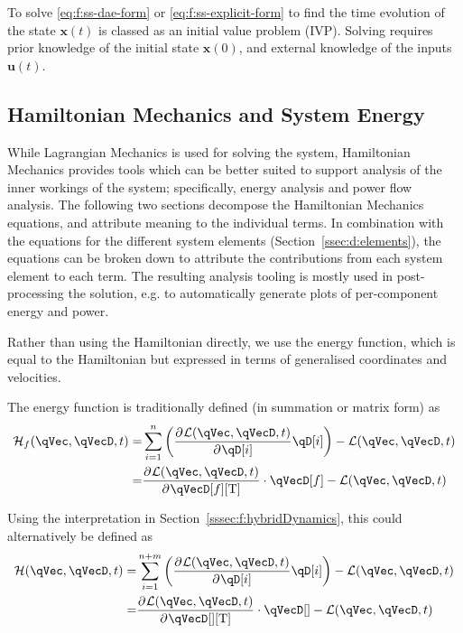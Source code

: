 \documentclass[11pt]{article}
\renewcommand{\secref}[1]{Section~\ref{#1}}
\newcommand{\pD}[2]{
    \frac{\partial\mspace{1mu}#1}{\partial\mspace{1mu}#2}
}
\begin{document}
To solve \eqref{eq:f:ss-dae-form} or \eqref{eq:f:ss-explicit-form} to find the time evolution of the state $\mathbf{x}(t)$ is classed as an initial value problem (IVP). Solving requires prior knowledge of the initial state $\mathbf{x}(0)$, and external knowledge of the inputs $\mathbf{u}(t)$.


\subsection{Hamiltonian Mechanics and System Energy} \label{ssec:f:hamiltonian}
While Lagrangian Mechanics is used for solving the system, Hamiltonian Mechanics provides tools which can be better suited to support analysis of the inner workings of the system; specifically, energy analysis and power flow analysis. The following two sections decompose the Hamiltonian Mechanics equations, and attribute meaning to the individual terms. In combination with the equations for the different system elements (\secref{ssec:d:elements}), the equations can be broken down to attribute the contributions from each system element to each term. The resulting analysis tooling is mostly used in post-processing the solution, e.g. to automatically generate plots of per-component energy and power.

Rather than using the Hamiltonian directly, we use the energy function, which is equal to the Hamiltonian but expressed in terms of generalised coordinates and velocities.

The energy function is traditionally defined (in summation or matrix form) as
\begin{align} \label{eq:f:Hf}
    \mathcal{H}_f(\qVec, \qVecD, t)
    =& \sum_{i=1}^{n} \del{\pD{\mathcal{L}(\qVec, \qVecD, t)}{\qD[i]} \qD[i]}
    - \mathcal{L}(\qVec, \qVecD, t) \nonumber\\
    =& \pD{\mathcal{L}(\qVec, \qVecD, t)}{\qVecD[f][\mathrm{T}]} \cdot \qVecD[f]
    - \mathcal{L}(\qVec, \qVecD, t)
\end{align}

Using the interpretation in \secref{sssec:f:hybridDynamics}, this could alternatively be defined as
\begin{align} \label{eq:f:H}
    \mathcal{H}(\qVec, \qVecD, t)
    =& \sum_{i=1}^{n+m} \del{\pD{\mathcal{L}(\qVec, \qVecD, t)}{\qD[i]} \qD[i]}
    - \mathcal{L}(\qVec, \qVecD, t) \nonumber\\
    =& \pD{\mathcal{L}(\qVec, \qVecD, t)}{\qVecD[][\mathrm{T}]} \cdot \qVecD[]
    - \mathcal{L}(\qVec, \qVecD, t)
\end{align}
\end{document}
